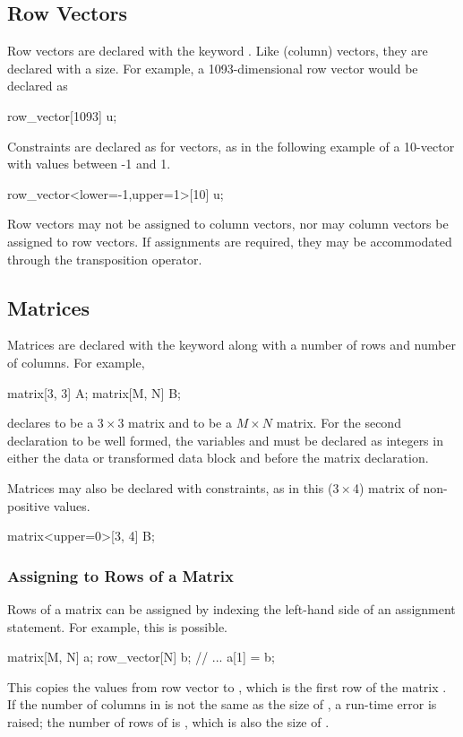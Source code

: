 \subsection{Row Vectors}

Row vectors are declared with the keyword .
Like (column) vectors, they are declared with a size.  For example,
a 1093-dimensional row vector  would be declared as
%
\begin{stancode}
row_vector[1093] u;
\end{stancode}
%
Constraints are declared as for vectors, as in the following example
of a 10-vector with values between -1 and 1.
\begin{stancode}
row_vector<lower=-1,upper=1>[10] u;
\end{stancode}
%

Row vectors may not be assigned to column vectors, nor may column
vectors be assigned to row vectors.  If assignments are required, they
may be accommodated through the transposition operator.

\subsection{Matrices}

Matrices are declared with the keyword  along with a
number of rows and number of columns.  For example,
%
\begin{stancode}
matrix[3, 3] A;
matrix[M, N] B;
\end{stancode}
%
declares  to be a $3 \times 3$ matrix and  to be a $M
\times N$ matrix.  For the second declaration to be well formed, the
variables  and  must be declared as integers in either
the data or transformed data block and before the matrix declaration.

Matrices may also be declared with constraints, as in this ($3 \times $4)
matrix of non-positive values.
%
\begin{stancode}
matrix<upper=0>[3, 4] B;
\end{stancode}
%

\subsubsection{Assigning to Rows of a Matrix}

Rows of a matrix can be assigned by indexing the left-hand side of an
assignment statement. For example, this is possible.
%
\begin{stancode}
matrix[M, N] a;
row_vector[N] b;
// ...
a[1] = b;
\end{stancode}
%
This copies the values from row vector  to , which
is the first row of the matrix .  If the number of columns in
 is not the same as the size of , a run-time error is
raised;  the number of rows of  is , which is also the
size of .

